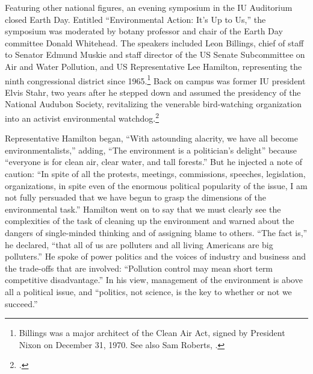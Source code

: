\documentclass[
  american,
  letterpaper,
]{scrreprt}
\begin{document}
Featuring other national figures, an evening symposium in the IU
Auditorium closed Earth Day. Entitled ``Environmental Action: It's Up to
Us,'' the symposium was moderated by botany professor and chair of the
Earth Day committee Donald Whitehead. The speakers included Leon
Billings, chief of staff to Senator Edmund Muskie and staff director of
the US Senate Subcommittee on Air and Water Pollution, and US
Representative Lee Hamilton, representing the ninth congressional
district since 1965.\footnote{Billings was a major architect of the
  Clean Air Act, signed by President Nixon on December 31, 1970. See
  also Sam Roberts, .} Back on campus was former IU
president Elvis Stahr, two years after he stepped down and assumed the
presidency of the National Audubon Society, revitalizing the venerable
bird-watching organization into an activist environmental
watchdog.\footnote{.}

Representative Hamilton began, ``With astounding alacrity, we have all
become environmentalists,'' adding, ``The environment is a politician's
delight'' because ``everyone is for clean air, clear water, and tall
forests.'' But he injected a note of caution: ``In spite of all the
protests, meetings, commissions, speeches, legislation, organizations,
in spite even of the enormous political popularity of the issue, I am
not fully persuaded that we have begun to grasp the dimensions of the
environmental task.'' Hamilton went on to say that we must clearly see
the complexities of the task of cleaning up the environment and warned
about the dangers of single-minded thinking and of assigning blame to
others. ``The fact is,'' he declared, ``that all of us are polluters and
all living Americans are big polluters.'' He spoke of power politics and
the voices of industry and business and the trade-offs that are
involved: ``Pollution control may mean short term competitive
disadvantage.'' In his view, management of the environment is above all
a political issue, and ``politics, not science, is the key to whether or
not we succeed.''
\end{document}
